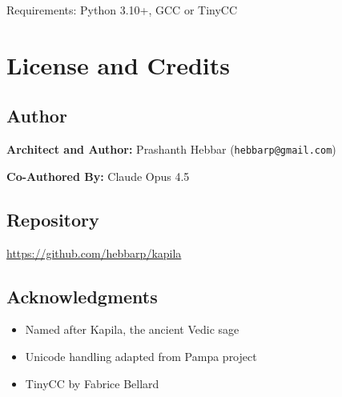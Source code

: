 \documentclass[11pt,a4paper]{report}
\begin{document}
Requirements: Python 3.10+, GCC or TinyCC

\chapter{License and Credits}

\section{Author}

\textbf{Architect and Author:} Prashanth Hebbar (\texttt{hebbarp@gmail.com})

\textbf{Co-Authored By:} Claude Opus 4.5

\section{Repository}

\url{https://github.com/hebbarp/kapila}

\section{Acknowledgments}

\begin{itemize}
    \item Named after Kapila, the ancient Vedic sage
    \item Unicode handling adapted from Pampa project
    \item TinyCC by Fabrice Bellard
\end{itemize}
\end{document}
